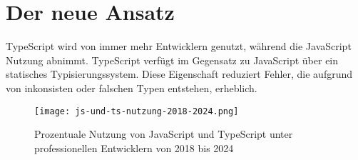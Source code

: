 \chapter{Der neue Ansatz} \label{der-neue-ansatz}

TypeScript wird von immer mehr Entwicklern genutzt, während die JavaScript Nutzung abnimmt. TypeScript verfügt im Gegensatz zu JavaScript über ein statisches Typisierungssystem. Diese Eigenschaft reduziert Fehler, die aufgrund von inkonsisten oder falschen Typen entstehen, erheblich.


\begin{figure}[h!]
  \texttt{[image: js-und-ts-nutzung-2018-2024.png]}
  \caption{Prozentuale Nutzung von JavaScript und TypeScript unter professionellen Entwicklern von 2018 bis 2024}
  \label{fig:js-und-ts-nutzung-2018-2024}
\end{figure}

